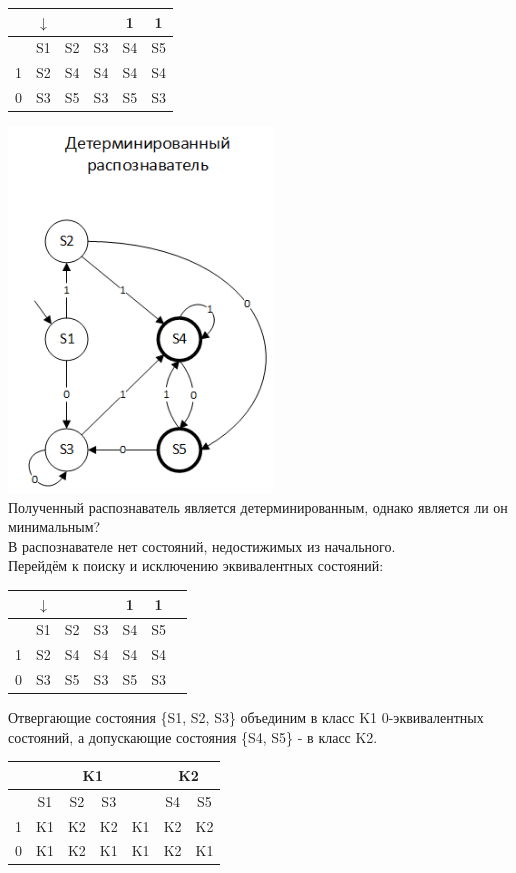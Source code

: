 \documentclass[a4paper,14pt]{extarticle}
\begin{document}
\begin{enumerate}[1.]
\begin{tabular}{|c|c|c|c|c|c|}
    \hline
    & $\downarrow$ & & & 1 & 1 \\
    \hline
    & S1 & S2 & S3 & S4 & S5 \\
    \hline
    1 & S2 & S4 & S4 & S4 & S4 \\
    \hline
    0 & S3 & S5  & S3 & S5 & S3 \\
    \hline
\end{tabular}
\includegraphics[width=70mm]{task3_determined}\\

Полученный распознаватель является детерминированным, однако является ли он 
минимальным?\\
В распознавателе нет состояний, недостижимых из начального.\\
Перейдём к поиску и исключению эквивалентных состояний:\\
\begin{tabular}{|c|c|c|c|c|c|c|}
    \hline
    & $\downarrow$ & & & 1 & 1 &\\
    \hline
    & S1 & S2 & S3 & S4 & S5 &\\
    \hline
    1 & S2 & S4 & S4 & S4 & S4& \\
    \hline
    0 & S3 & S5  & S3 & S5 & S3& \\
    \hline
\end{tabular}

Отвергающие состояния \{S1, S2, S3\} объединим в класс K1 0-эквивалентных состояний, 
а допускающие состояния \{S4, S5\} - в класс K2.

\begin{tabular}{|c|c|c|c|c|c|c|}
    \hline
    & \multicolumn{4}{c|}{K1} & \multicolumn{2}{c|}{K2} \\
    \hline
    & S1 & S2 & S3&    & S4 & S5 \\
    \hline
    1 & K1 & K2 & K2 & K1 & K2 & K2 \\
    \hline
    0 & K1 & K2  & K1 & K1 & K2 & K1 \\
    \hline
\end{tabular}


\end{enumerate}
\end{document}
